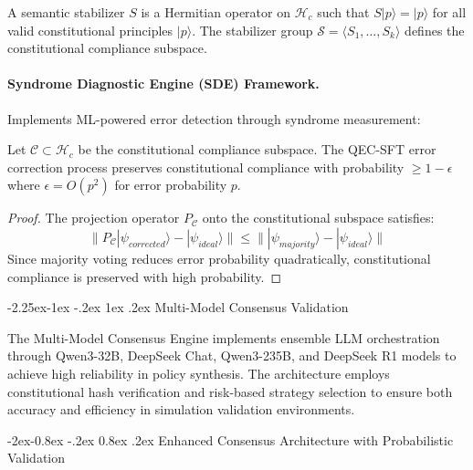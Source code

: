 \documentclass[manuscript,screen,9pt]{acmart}
\makeatletter
\renewcommand\subsection{\@startsection{subsection}{2}{\z@}%
  {-2.25ex\@plus -1ex \@minus -.2ex}%
  {1ex \@plus .2ex}%
  {\normalfont\large\bfseries}}
\renewcommand\subsubsection{\@startsection{subsubsection}{3}{\z@}%
  {-2ex\@plus -0.8ex \@minus -.2ex}%
  {0.8ex \@plus .2ex}%
  {\normalfont\normalsize\bfseries}}
\makeatother
\begin{document}
\begin{table}[!htb]
\begin{definition}
A semantic stabilizer $S$ is a Hermitian operator on $\mathcal{H}_c$ such that $S|p\rangle = |p\rangle$ for all valid constitutional principles $|p\rangle$. The stabilizer group $\mathcal{S} = \langle S_1, \ldots, S_k \rangle$ defines the constitutional compliance subspace.
\end{definition}

\paragraph{Syndrome Diagnostic Engine (SDE) Framework.} Implements ML-powered error detection through syndrome measurement:

\begin{theorem}
Let $\mathcal{C} \subset \mathcal{H}_c$ be the constitutional compliance subspace. The QEC-SFT error correction process preserves constitutional compliance with probability $\geq 1 - \epsilon$ where $\epsilon = O(p^2)$ for error probability $p$.
\end{theorem}

\begin{proof}
The projection operator $P_{\mathcal{C}}$ onto the constitutional subspace satisfies:
$$\|P_{\mathcal{C}}|\psi_{corrected}\rangle - |\psi_{ideal}\rangle\| \leq \||\psi_{majority}\rangle - |\psi_{ideal}\rangle\|$$
Since majority voting reduces error probability quadratically, constitutional compliance is preserved with high probability.
\end{proof}

\subsection{Multi-Model Consensus Validation}
\label{subsec:multi_model_consensus}

The Multi-Model Consensus Engine implements ensemble LLM orchestration through Qwen3-32B, DeepSeek Chat, Qwen3-235B, and DeepSeek R1 models to achieve high reliability in policy synthesis. The architecture employs constitutional hash verification and risk-based strategy selection to ensure both accuracy and efficiency in simulation validation environments.

\subsubsection{Enhanced Consensus Architecture with Probabilistic Validation}
\label{subsubsec:enhanced_consensus}


\end{table}
\end{document}
